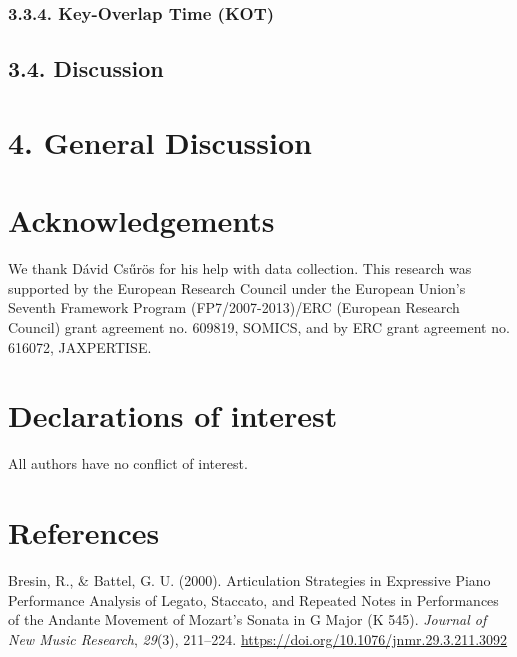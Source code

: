 \documentclass[
  english,
  man,floatsintext]{apa6}
\newlength{\cslhangindent}
\newenvironment{cslreferences}%
  {\setlength{\parindent}{0pt}%
  \everypar{\setlength{\hangindent}{\cslhangindent}}\ignorespaces}%
  {\par}
\begin{document}
\hypertarget{key-overlap-time-kot-3}{%
\subsubsection{3.3.4. Key-Overlap Time (KOT)}\label{key-overlap-time-kot-3}}

\hypertarget{discussion-1}{%
\subsection{3.4. Discussion}\label{discussion-1}}

\newpage

\hypertarget{general-discussion}{%
\section{4. General Discussion}\label{general-discussion}}

\hypertarget{acknowledgements}{%
\section{Acknowledgements}\label{acknowledgements}}

We thank Dávid Csűrös for his help with data collection. This research was supported by the European Research Council under the European Union's Seventh Framework Program (FP7/2007-2013)/ERC (European Research Council) grant agreement no. 609819, SOMICS, and by ERC grant agreement no. 616072, JAXPERTISE.

\hypertarget{declarations-of-interest}{%
\section{Declarations of interest}\label{declarations-of-interest}}

All authors have no conflict of interest.

\newpage

\hypertarget{references}{%
\section{References}\label{references}}

\begingroup
\setlength{\parindent}{-0.5in}
\setlength{\leftskip}{0.5in}

\hypertarget{refs}{}
\begin{cslreferences}
\leavevmode\hypertarget{ref-bresin_2000}{}%
Bresin, R., \& Battel, G. U. (2000). Articulation Strategies in Expressive Piano Performance Analysis of Legato, Staccato, and Repeated Notes in Performances of the Andante Movement of Mozart's Sonata in G Major (K 545). \emph{Journal of New Music Research}, \emph{29}(3), 211--224. \url{https://doi.org/10.1076/jnmr.29.3.211.3092}
\end{cslreferences}

\endgroup
\raggedbottom
\end{document}

